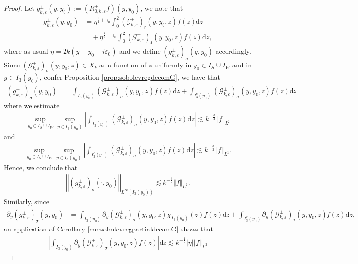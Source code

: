 \documentclass[11pt,reqno]{amsproc}
\theoremstyle{definition}
\numberwithin{equation}{section}
\newcommand{\G}{{\mathcal{G}}}
\newcommand{\sr}{{\mathsf{r}}}
\newcommand{\s}{{\mathsf{s}}}
\newcommand{\uv}{{0}}
\newcommand{\ov}{{2}}
\renewcommand{\d}{\mathrm{d}}
\newcommand{\ep}{\varepsilon}
\begin{document}
\begin{proof}
Let $g_{k,\ep}^\pm(y,y_0) := (R_{0,k,\ep}^\pm f)(y,y_0)$, we note that
\begin{align*}
g_{k,\ep}^\pm(y,y_0) &=\eta^{\frac12+\gamma_0} \int_\uv ^ \ov \left( \G_{k,\ep}^\pm\right)_\sr(y,y_0,z) f(z) \d z \\
&\quad+\eta^{\frac12-\gamma_0} \int_\uv ^ \ov \left( \G_{k,\ep}^\pm\right)_\s (y,y_0,z) f(z) \d z,
\end{align*}
where as usual $\eta=2k(y-y_0\pm i\ep_0)$ and we define $\left( g_{k,\ep}^\pm\right)_{\sigma}(y,y_0)$ accordingly. Since $\left( \G_{k,\ep}^\pm\right)_{\sigma}(y,y_0,z)\in X_k$ as a function of $z$ uniformly in $y_0\in I_S \cup I_W$ and in $y\in I_3(y_0)$, confer Proposition \ref{prop:sobolevregdecomG}, we have that 
\begin{align*}
\left( g_{k,\ep}^\pm\right)_{\sigma}(y,y_0) &= \int_{I_3(y_0)} \left( \G_{k,\ep}^\pm\right)_{\sigma}(y,y_0,z) f(z) \d z+ \int_{I_3^c(y_0)} \left( \G_{k,\ep}^\pm\right)_{\sigma}(y,y_0,z) f(z) \d z
\end{align*}
where we estimate
\begin{align*}
\sup_{y_0\in I_S \cup I_W}\sup_{y\in I_3(y_0)}\left| \int_{I_3(y_0)} \left( \G_{k,\ep}^\pm\right)_{\sigma}(y,y_0,z)f(z) \d z \right| \lesssim k^{-\frac32}\Vert f \Vert_{L^2}
\end{align*}
and
\begin{align*}
\sup_{y_0\in I_S \cup I_W}\sup_{y\in I_3(y_0)}\left| \int_{I_3^c(y_0)} \left( \G_{k,\ep}^\pm\right)_{\sigma}(y,y_0,z) f(z) \d z \right| \lesssim k^{-\frac32}\Vert f \Vert_{L^2}.
\end{align*}
Hence, we conclude that
\begin{align*}
\left\Vert \left( g_{k,\ep}^\pm\right)_{\sigma}(\cdot,y_0) \right\Vert_{L^\infty(I_3(y_0))}\lesssim k^{-\frac32}\Vert f \Vert_{L^2}.
\end{align*}
Similarly, since
\begin{align*}
\partial_y\left( g_{k,\ep}^\pm\right)_{\sigma}(y,y_0) &= \int_{I_3(y_0)} \partial_y\left( \G_{k,\ep}^\pm\right)_{\sigma}(y,y_0,z)\chi_{I_3(y_0)}(z) f(z) \d z + \int_{I_3^c(y_0)} \partial_y\left( \G_{k,\ep}^\pm\right)_{\sigma}(y,y_0,z) f(z) \d z,
\end{align*}
an application of Corollary \ref{cor:sobolevregpartialdecomG} shows that
\begin{align*}
 \left| \int_{I_3(y_0)} \partial_y\left( \G_{k,\ep}^\pm\right)_{\sigma}(y,y_0,z)f(z) \right| \d z \lesssim k^{-\frac12}|\eta|\Vert f \Vert_{L^2}

\end{align*}
\end{proof}
\end{document}
